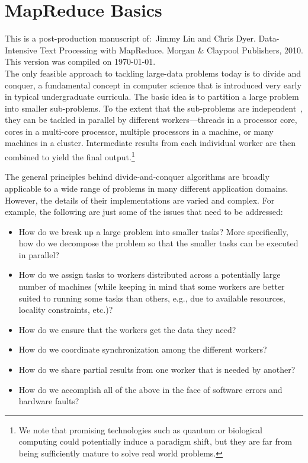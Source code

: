 \chapter{MapReduce Basics}
\label{chapter2}

\thispagestyle{empty}

\noindent This is a post-production manuscript of:\ Jimmy Lin and
Chris Dyer. Data-Intensive Text Processing with MapReduce. Morgan \&
Claypool Publishers, 2010. This version was compiled on \today.\\

The only feasible approach to tackling large-data problems today is to
divide and conquer, a fundamental concept in computer science that is
introduced very early in typical undergraduate curricula.  The basic
idea is to partition a large problem into smaller sub-problems.  To
the extent that the sub-problems are independent~\cite{Amdahl_1967},
they can be tackled in parallel by different workers---threads in a
processor core, cores in a multi-core processor, multiple processors
in a machine, or many machines in a cluster.  Intermediate results
from each individual worker are then combined to yield the final
output.\footnote{We note that promising technologies such as quantum
or biological computing could potentially induce a paradigm shift, but
they are far from being sufficiently mature to solve real world
problems.}

The general principles behind divide-and-conquer algorithms are
broadly applicable to a wide range of problems in many different
application domains.  However, the details of their implementations
are varied and complex.  For example, the following are just some of
the issues that need to be addressed:

\begin{itemize}

\item How do we break up a large problem into smaller tasks?  
  More specifically, how do we decompose the problem so that the
  smaller tasks can be executed in parallel?

\item How do we assign tasks to workers distributed across a
  potentially large number of machines (while keeping in mind that
  some workers are better suited to running some tasks than others,
  e.g., due to available resources, locality constraints, etc.)?

\item How do we ensure that the workers get the data they need?

\item How do we coordinate synchronization among the different
  workers?

\item How do we share partial results from one worker that is needed
  by another?

\item How do we accomplish all of the above in the face of software
  errors and hardware faults?

\end{itemize}

